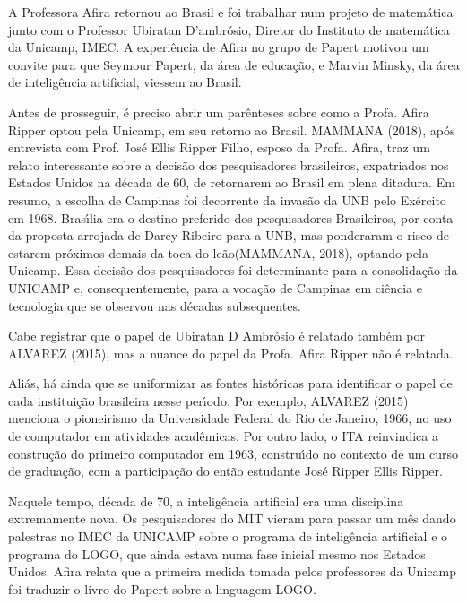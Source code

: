 \documentclass[
12pt,		%
openright,	%
twoside,  %
a4paper,			%
chapter=TITLE,		%
english,			%
french,				%
spanish,			%
brazil				%
]{USPSC-classe/USPSC}
\begin{document}
A Professora Afira retornou ao Brasil e foi trabalhar num projeto de matem\'atica junto com o Professor Ubiratan D’ambr\'osio, Diretor do Instituto de matem\'atica da Unicamp, IMEC. A experi\^encia de Afira no grupo de Papert motivou um convite para que Seymour Papert, da \'area de educa\c{c}\~ao, e Marvin Minsky, da \'area de intelig\^encia artificial, viessem ao Brasil.




Antes de prosseguir, \'e preciso abrir um par\^enteses sobre como a Profa. Afira Ripper optou pela Unicamp, em seu retorno ao Brasil.  MAMMANA (2018), ap\'os entrevista com Prof. Jos\'e Ellis Ripper Filho, esposo da Profa. Afira, traz um relato interessante sobre a decis\~ao dos pesquisadores brasileiros, expatriados nos Estados Unidos na d\'ecada de 60, de retornarem ao Brasil em plena ditadura. Em resumo, a escolha de Campinas foi decorrente da invas\~ao da UNB pelo Ex\'ercito em 1968. Bras\'{\i}lia era o destino preferido dos pesquisadores Brasileiros, por conta da proposta arrojada de Darcy Ribeiro para a UNB, mas ponderaram o risco de estarem pr\'oximos demais da \textquotedbl toca do le\~ao\textquotedbl   (MAMMANA, 2018), optando pela Unicamp. Essa decis\~ao dos pesquisadores foi determinante para a consolida\c{c}\~ao da UNICAMP e, consequentemente, para a voca\c{c}\~ao de Campinas em ci\^encia e tecnologia que se observou nas d\'ecadas subsequentes.




Cabe registrar que o papel de Ubiratan D Ambr\'osio \'e relatado tamb\'em por ALVAREZ (2015), mas a nuance do papel da Profa. Afira Ripper n\~ao \'e relatada.




Ali\'as, h\'a ainda que se uniformizar as fontes hist\'oricas para identificar o papel de cada institui\c{c}\~ao brasileira nesse per\'{\i}odo. Por exemplo,  ALVAREZ (2015) menciona o pioneirismo da Universidade Federal do Rio de Janeiro, 1966, no uso de computador em atividades acad\^emicas. Por outro lado, o ITA reinvindica a constru\c{c}\~ao do primeiro computador em 1963, constru\'{\i}do no contexto de um curso de gradua\c{c}\~ao, com a participa\c{c}\~ao do ent\~ao estudante Jos\'e Ripper Ellis Ripper.




Naquele tempo, d\'ecada de 70, a intelig\^encia artificial era uma disciplina extremamente nova. Os pesquisadores do MIT vieram para passar um m\^es dando palestras no IMEC da UNICAMP sobre o programa de intelig\^encia artificial e o programa do LOGO, que ainda estava numa fase inicial mesmo nos Estados Unidos. Afira relata que a primeira medida tomada pelos professores da Unicamp foi traduzir o livro do Papert sobre a linguagem LOGO.
\end{document}
